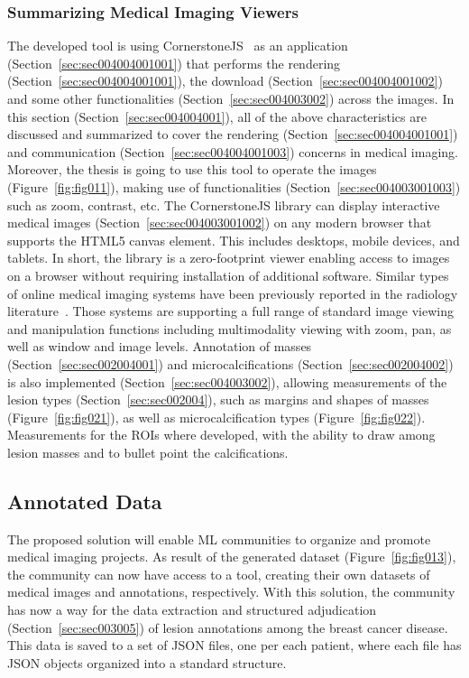 \subsubsection{Summarizing Medical Imaging Viewers}
\label{sec:sec004004001004}

The developed tool is using CornerstoneJS~\cite{10.1117/12.2513004} as an application (Section~\ref{sec:sec004004001001}) that performs the rendering (Section~\ref{sec:sec004004001001}), the download (Section~\ref{sec:sec004004001002}) and some other functionalities (Section~\ref{sec:sec004003002}) across the images.
In this section (Section~\ref{sec:sec004004001}), all of the above characteristics are discussed and summarized to cover the rendering (Section~\ref{sec:sec004004001001}) and communication (Section~\ref{sec:sec004004001003}) concerns in medical imaging.
Moreover, the thesis is going to use this tool to operate the images (Figure~\ref{fig:fig011}), making use of functionalities (Section~\ref{sec:sec004003001003}) such as zoom, contrast, etc.
The CornerstoneJS library can display interactive medical images (Section~\ref{sec:sec004003001002}) on any modern browser that supports the HTML5 canvas element.
This includes desktops, mobile devices, and tablets.
In short, the library is a zero-footprint viewer enabling access to images on a browser without requiring installation of additional software.
Similar types of online medical imaging systems have been previously reported in the radiology literature~\cite{HOSTETTER2018811}.
Those systems are supporting a full range of standard image viewing and manipulation functions including multimodality viewing with zoom, pan, as well as window and image levels.
Annotation of masses (Section~\ref{sec:sec002004001}) and microcalcifications (Section~\ref{sec:sec002004002}) is also implemented (Section~\ref{sec:sec004003002}), allowing measurements of the lesion types (Section~\ref{sec:sec002004}), such as margins and shapes of masses (Figure~\ref{fig:fig021}), as well as microcalcification types (Figure~\ref{fig:fig022}).
Measurements for the \acp{ROI} where developed, with the ability to draw among lesion masses and to bullet point the calcifications.

\subsection{Annotated Data}
\label{sec:sec004004002}

The proposed solution will enable \ac{ML} communities to organize and promote medical imaging projects.
As result of the generated dataset (Figure~\ref{fig:fig013}), the community can now have access to a tool, creating their own datasets of medical images and annotations, respectively.
With this solution, the community has now a way for the data extraction and structured adjudication (Section~\ref{sec:sec003005}) of lesion annotations among the breast cancer disease.
This data is saved to a set of \ac{JSON} files, one per each patient, where each file has \ac{JSON} objects organized into a standard structure.

